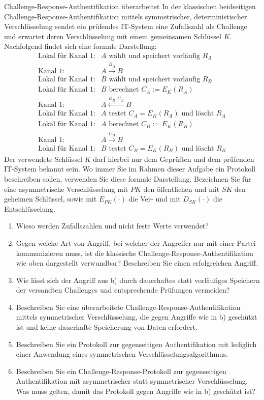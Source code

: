\documentclass{article}
\begin{document}
\begin{exercise}{Challenge-Response-Authentifikation überarbeitet}
  In der klassischen beidseitigen Challenge-Response-Authentifikation mittels symmetrischer, deterministischer Verschlüsselung sendet ein prüfendes IT-System eine Zufallszahl als Challenge und erwartet deren Verschlüsselung mit einem gemeinsamen Schlüssel $K$. Nachfolgend findet sich eine formale Darstellung:
  \begin{align*}
    \text{Lokal für Kanal 1:} & A \text{ wählt und speichert vorläufig } R_A\\
    \text{Kanal 1:} & A \xrightarrow{R_A} B\\
    \text{Lokal für Kanal 1:} & B \text{ wählt und speichert vorläufig } R_B\\
    \text{Lokal für Kanal 1:} & B \text{ berechnet } C_A := E_K(R_A)\\
    \text{Kanal 1:} & A \xleftarrow{R_B, C_A} B\\
    \text{Lokal für Kanal 1:} & A \text{ testet } C_A = E_K(R_A) \text{ und löscht } R_A\\
    \text{Lokal für Kanal 1:} & A \text{ berechnet } C_B := E_K(R_B)\\
    \text{Kanal 1:} & A \xrightarrow{C_B} B\\
    \text{Lokal für Kanal 1:} & B \text{ testet } C_B = E_K(R_B) \text{ und löscht } R_B
  \end{align*}
  Der verwendete Schlüssel $K$ darf hierbei nur dem Geprüften und dem prüfenden IT-System bekannt sein. Wo immer Sie im Rahmen dieser Aufgabe ein Protokoll beschreiben sollen, verwenden Sie diese formale Darstellung. Bezeichnen Sie für eine asymmetrische Verschlüsselung mit $PK$ den öffentlichen und mit $SK$ den geheimen Schlüssel, sowie mit $E_{PK}(\cdot)$ die Ver- und mit $D_{SK}(\cdot)$ die Entschlüsselung.
  \begin{enumerate}
    \item Wieso werden Zufallszahlen und nicht feste Werte verwendet?
    \item Gegen welche Art von Angriff, bei welcher der Angreifer nur mit einer Partei kommunizieren muss, ist die klassische Challenge-Response-Authentifikation wie oben dargestellt verwundbar? Beschreiben Sie einen erfolgreichen Angriff.
    \item Wie lässt sich der Angriff aus b) durch dauerhaftes statt vorläufiges Speichern der versandten Challenges und entsprechende Prüfungen vermeiden?
    \item Beschreiben Sie eine überarbeitete Challenge-Response-Authentifikation mittels symmetrischer Verschlüsselung, die gegen Angriffe wie in b) geschützt ist und keine dauerhafte Speicherung von Daten erfordert.
    \item Beschreiben Sie ein Protokoll zur gegenseitigen Authentifikation mit lediglich einer Anwendung eines symmetrischen Verschlüsselungsalgorithmus.
    \item Beschreiben Sie ein Challenge-Response-Protokoll zur gegenseitigen Authentifikation mit asymmetrischer statt symmetrischer Verschlüsselung. Was muss gelten, damit das Protokoll gegen Angriffe wie in b) geschützt ist?
  \end{enumerate}


\end{exercise}
\end{document}
